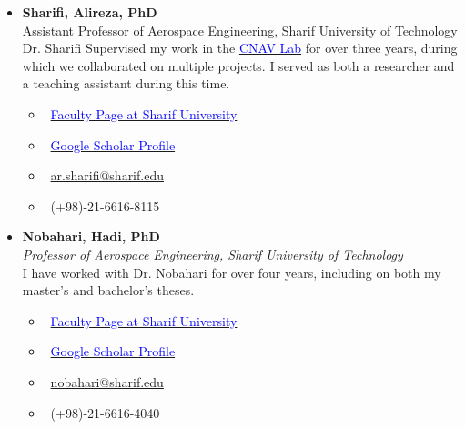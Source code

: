 \documentclass[12pt]{article}
\begin{document}
\begin{itemize}
	\item \textbf{Sharifi, Alireza, PhD} \\
	Assistant Professor of Aerospace Engineering, Sharif University of Technology \\
Dr. Sharifi Supervised my work in the \href{https://www.linkedin.com/company/cnav-lab/}{\textcolor{blue}{CNAV Lab}} for over three years, during which we collaborated on multiple projects.
I served as both a researcher and a teaching assistant during this time.
	\begin{multicols}{2}
		\begin{itemize}
			\item \faGlobe \ \href{https://ae.sharif.edu/~portal/faculty/1730782165}{\textcolor{blue}{Faculty Page at Sharif University}}
			\item \faGraduationCap \ \href{https://scholar.google.com/citations?user=k_OdlNMAAAAJ&hl=en}{\textcolor{blue}{Google Scholar Profile}}
			\item \faEnvelope \ \href{mailto:ar.sharifi@sharif.edu}{ar.sharifi@sharif.edu}
			\item \faPhone \ (+98)-21-6616-8115
		\end{itemize}
\end{multicols}
\end{itemize}



\begin{itemize}
	\item \textbf{Nobahari, Hadi, PhD} \vspace{1pt}\\
	\textit{Professor of Aerospace Engineering, Sharif University of Technology}
	 \vspace{2pt}\\
	I have worked with Dr. Nobahari for over four years, including on both my master's and bachelor's theses.
	\begin{multicols}{2}
		\begin{itemize}
			\item \faGlobe \ \href{https://ae.sharif.edu/~portal/faculty/1091235256}{\textcolor{blue}{Faculty Page at Sharif University}}
			\item \faGraduationCap \ \href{https://scholar.google.com/citations?user=vuUPY9kAAAAJ&hl=en&oi=ao}{\textcolor{blue}{Google Scholar Profile}}
			\item \faEnvelope \ \href{mailto:nobahari@sharif.edu}{nobahari@sharif.edu}
			\item \faPhone \ (+98)-21-6616-4040
		\end{itemize}
\end{multicols}
\end{itemize}
\end{document}
